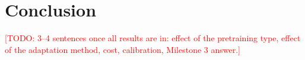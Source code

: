 \documentclass[conference]{IEEEtran}
\newcommand{\todo}[1]{\textcolor{red}{[TODO: #1]}}
\begin{document}
\section{Conclusion}
\todo{3--4 sentences once all results are in: effect of the pretraining type, effect of the adaptation method, cost, calibration, Milestone 3 answer.}



\end{document}
